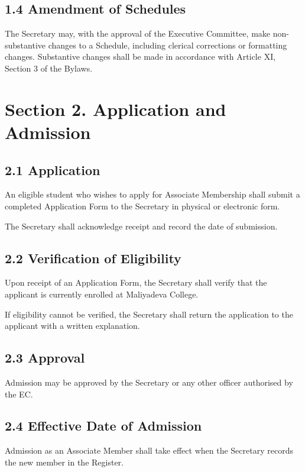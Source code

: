 \documentclass[a4paper]{article}
\begin{document}
\subsection*{1.4 Amendment of Schedules}
The Secretary may, with the approval of the Executive Committee, make
non-substantive changes to a Schedule, including clerical corrections
or formatting changes. Substantive changes shall be made in accordance
with Article XI, Section 3 of the Bylaws.

\section*{Section 2. Application and Admission}

\subsection*{2.1 Application}

An eligible student who wishes to apply for Associate Membership shall
submit a completed Application Form to the Secretary in physical or
electronic form.

The Secretary shall acknowledge receipt and record the date of
submission.

\subsection*{2.2 Verification of Eligibility}
Upon receipt of an Application Form, the Secretary shall verify that
the applicant is currently enrolled at Maliyadeva College.

If eligibility cannot be verified, the Secretary shall return the
application to the applicant with a written explanation.

\subsection*{2.3 Approval}
Admission may be approved by the Secretary or any other officer authorised by the EC.

\subsection*{2.4 Effective Date of Admission}
Admission as an Associate Member shall take effect when the Secretary
records the new member in the Register.
\end{document}
